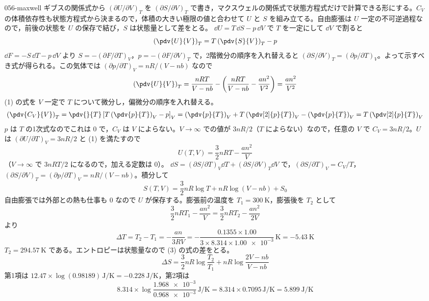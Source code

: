 \documentclass[uplatex,dvipdfmx,a4paper,11pt]{jsarticle}
\begin{document}
\kaitouhen
{}
\begin{kaisetsu}{056-maxwell}
\houshin ギブスの関係式から $(\partial U/\partial V)_{T}$ を $(\partial S/\partial V)_{T}$ で書き，マクスウェルの関係式で状態方程式だけで計算できる形にする。$C_{V}$ の体積依存性も状態方程式から決まるので，体積の大きい極限の値と合わせて $U$ と $S$ を組み立てる。自由膨張は $U$ 一定の不可逆過程なので，前後の状態を $U$ の保存で結び，$S$ は状態量として差をとる。
\keisan {} $\dd U=T\,\dd S-p\,\dd V$ で $T$ を一定にして $\dd V$ で割ると
\[ \left(\pdv{U}{V}\right)_{T}=T\left(\pdv{S}{V}\right)_{T}-p \]
$\dd F=-S\,\dd T-p\,\dd V$ より $S=-(\partial F/\partial T)_{V}$，$p=-(\partial F/\partial V)_{T}$ で，2階微分の順序を入れ替えると $(\partial S/\partial V)_{T}=(\partial p/\partial T)_{V}$。よって示すべき式が得られる。この気体では $(\partial p/\partial T)_{V}=nR/(V-nb)$ なので
\[ \left(\pdv{U}{V}\right)_{T}=\frac{nRT}{V-nb}-\left(\frac{nRT}{V-nb}-\frac{an^{2}}{V^{2}}\right)=\frac{an^{2}}{V^{2}} \]
 (1) の式を $V$ 一定で $T$ について微分し，偏微分の順序を入れ替える。
\[ \left(\pdv{C_{V}}{V}\right)_{T}=\pdv{}{T}\left[T\left(\pdv{p}{T}\right)_{V}-p\right]_{V}=\left(\pdv{p}{T}\right)_{V}+T\left(\pdv[2]{p}{T}\right)_{V}-\left(\pdv{p}{T}\right)_{V}=T\left(\pdv[2]{p}{T}\right)_{V} \]
$p$ は $T$ の1次式なのでこれは $0$ で，$C_{V}$ は $V$ によらない。$V\to\infty$ での値が $3nR/2$（$T$ によらない）なので，任意の $V$ で $C_{V}=3nR/2$。$U$ は $(\partial U/\partial T)_{V}=3nR/2$ と (1) を満たすので
\[ U(T,V)=\frac{3}{2}nRT-\frac{an^{2}}{V} \]
（$V\to\infty$ で $3nRT/2$ になるので，加える定数は $0$）。
 $\dd S=(\partial S/\partial T)_{V}\dd T+(\partial S/\partial V)_{T}\dd V$ で，$(\partial S/\partial T)_{V}=C_{V}/T$，$(\partial S/\partial V)_{T}=(\partial p/\partial T)_{V}=nR/(V-nb)$。積分して
\[ S(T,V)=\frac{3}{2}nR\log T+nR\log(V-nb)+S_{0} \]
 自由膨張では外部との熱も仕事も $0$ なので $U$ が保存する。膨張前の温度を $T_{1}=\qty{300}{\kelvin}$，膨張後を $T_{2}$ として
\[ \frac{3}{2}nRT_{1}-\frac{an^{2}}{V}=\frac{3}{2}nRT_{2}-\frac{an^{2}}{2V} \]
より
\[ \Delta T=T_{2}-T_{1}=-\frac{an}{3RV}=-\frac{\num{0.1355}\times\num{1.00}}{3\times\num{8.314}\times\num{1.00e-3}}\,\unit{\kelvin}=\qty{-5.43}{\kelvin} \]
$T_{2}=\qty{294.57}{\kelvin}$ である。エントロピーは状態量なので (3) の式の差をとる。
\[ \Delta S=\frac{3}{2}nR\log\frac{T_{2}}{T_{1}}+nR\log\frac{2V-nb}{V-nb} \]
第1項は $\num{12.47}\times\log(\num{0.98189})\,\unit{\joule\per\kelvin}=\qty{-0.228}{\joule\per\kelvin}$，第2項は
\[ \num{8.314}\times\log\frac{\num{1.968e-3}}{\num{0.968e-3}}\,\unit{\joule\per\kelvin}=\num{8.314}\times\num{0.7095}\,\unit{\joule\per\kelvin}=\qty{5.899}{\joule\per\kelvin} \]

\end{kaisetsu}
\end{document}
